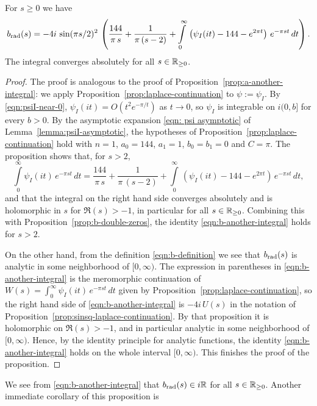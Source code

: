 \begin{proposition}\label{prop:b-another-integral}
For $s\geq0$ we have
\begin{equation}\label{eqn:b-another-integral}b_{\mathrm{rad}}(s)=-4i\,\sin(\pi s/2)^2\,\left(\frac{144}{\pi\,s}+\frac{1}{\pi\,(s-2)}+\int\limits_0^\infty\,\left(\psi_I(it)-144-e^{2\pi t}\right)\,e^{-\pi s t}\,dt\right).\end{equation}
The integral converges absolutely for all $s\in\mathbb{R}_{\geq 0}$.
\end{proposition}
\begin{proof}
The proof is analogous to the proof of Proposition~\ref{prop:a-another-integral}: we apply Proposition~\ref{prop:laplace-continuation} to $\psi := \psi_I$.
By \eqref{eqn:psiI-near-0}, $\psi_I(it) = O(t^2 e^{-\pi/t})$ as $t \to 0$, so $\psi_I$ is integrable on $i(0, b]$ for every $b > 0$.
By the asymptotic expansion \eqref{eqn: psi asymptotic} of Lemma~\ref{lemma:psiI-asymptotic}, the hypotheses of Proposition~\ref{prop:laplace-continuation} hold with $n = 1$, $a_0 = 144$, $a_1 = 1$, $b_0 = b_1 = 0$ and $C = \pi$. The proposition shows that, for $s > 2$,
\[
\int\limits_{0}^{\infty}\psi_I(it)\,e^{-\pi s t}\,dt
=\frac{144}{\pi\,s}+\frac{1}{\pi\,(s-2)}+\int\limits_0^\infty\,\left(\psi_I(it)-144-e^{2\pi t}\right)\,e^{-\pi s t}\,dt,
\]
and that the integral on the right hand side converges absolutely and is holomorphic in $s$ for $\Re(s) > -1$, in particular for all $s \in \mathbb{R}_{\geq 0}$.
Combining this with Proposition~\ref{prop:b-double-zeros}, the identity \eqref{eqn:b-another-integral} holds for $s>2$.

On the other hand, from the definition \eqref{eqn:b-definition} we see that $b_{\mathrm{rad}}(s)$ is analytic in some neighborhood of $[0,\infty)$.
The expression in parentheses in \eqref{eqn:b-another-integral} is the meromorphic continuation of $W(s) = \int_0^\infty \psi_I(it)\,e^{-\pi s t}\,dt$ given by Proposition~\ref{prop:laplace-continuation}, so the right hand side of \eqref{eqn:b-another-integral} is $-4i\,U(s)$ in the notation of Proposition~\ref{prop:sinsq-laplace-continuation}. By that proposition it is holomorphic on $\Re(s) > -1$, and in particular analytic in some neighborhood of $[0,\infty)$. Hence, by the identity principle for analytic functions, the identity \eqref{eqn:b-another-integral} holds on the whole interval $[0,\infty)$. This finishes the proof of the proposition.
\end{proof}
We see from \eqref{eqn:b-another-integral} that $b_{\mathrm{rad}}(s)\in i\mathbb{R}$ for all $s\in\mathbb{R}_{\geq0}$.
Another immediate corollary of this proposition is

